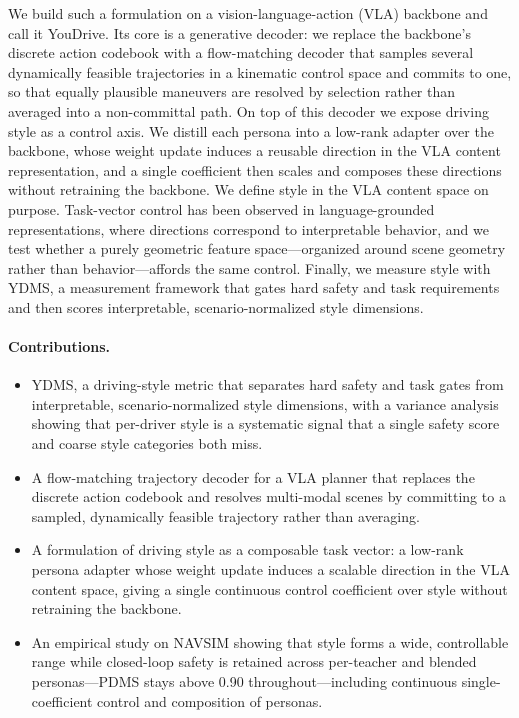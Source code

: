 We build such a formulation on a vision-language-action (VLA) backbone and call it
YouDrive. Its core is a generative decoder: we replace the backbone's discrete
action codebook with a flow-matching decoder that samples several dynamically
feasible trajectories in a kinematic control space and commits to one, so that
equally plausible maneuvers are resolved by selection rather than averaged into a
non-committal path. On top of this decoder we expose driving style as a control
axis. We distill each persona into a low-rank adapter over the backbone, whose
weight update induces a reusable direction in the VLA content representation, and a
single coefficient then scales and composes these directions without retraining the
backbone. We define style in the VLA content space on purpose. Task-vector control
has been observed in language-grounded representations, where directions correspond
to interpretable behavior,
and we test whether a purely geometric feature space---organized around scene
geometry rather than behavior---affords the same control. Finally, we measure
style with YDMS, a measurement framework that gates hard safety and task
requirements and then scores interpretable, scenario-normalized style dimensions.

\paragraph{Contributions.}
\begin{itemize}
    \item YDMS, a driving-style metric that separates hard safety and task gates
    from interpretable, scenario-normalized style dimensions, with a variance
    analysis showing that per-driver style is a systematic signal that a single
    safety score and coarse style categories both miss.
    \item A flow-matching trajectory decoder for a VLA planner that replaces the
    discrete action codebook and resolves multi-modal scenes by committing to a
    sampled, dynamically feasible trajectory rather than averaging.
    \item A formulation of driving style as a composable task vector: a low-rank
    persona adapter whose weight update induces a scalable direction in the VLA
    content space, giving a single continuous control coefficient over style without
    retraining the backbone.
    \item An empirical study on NAVSIM showing that style forms a wide, controllable
    range while closed-loop safety is retained across per-teacher and blended
    personas---PDMS stays above 0.90 throughout---including continuous
    single-coefficient control and composition of personas.
\end{itemize}

